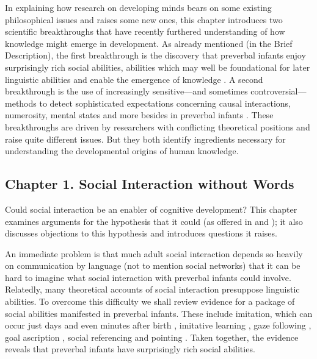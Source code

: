 \documentclass[12pt,\papersize]{extarticle}
\begin{document}
In explaining how research on developing minds bears on some existing philosophical issues and raises some new ones,
this chapter introduces two scientific breakthroughs that have recently furthered understanding of how knowledge might emerge in development.
As already mentioned (in the Brief Description), the first breakthrough is the discovery that preverbal infants enjoy surprisingly rich social abilities, abilities which
may well be foundational for later linguistic abilities and enable the emergence of knowledge \citep[e.g.][]{Csibra:2009xr,Meltzoff:2007pj,Tomasello:2005wx}. 
A second breakthrough is the use of increasingly sensitive---and sometimes controversial---methods to detect  sophisticated expectations concerning  causal interactions, numerosity, mental states and more besides in preverbal infants \citep[e.g.][]{Spelke:1990jn,Baillargeon:gx}.
These breakthroughs are driven by researchers with conflicting theoretical positions and raise quite different issues.  
But they both  identify ingredients necessary for understanding the developmental origins of human knowledge.



\subsection{Chapter 1. Social Interaction without Words}
Could social interaction be an enabler of cognitive development? 
This chapter examines arguments for the hypothesis that it could
 (as offered in \citealp{Tomasello:2003tq} and \citealp{Moll:2007gu}); it also discusses objections to this hypothesis and introduces questions it raises.
 
An immediate problem is that much adult social interaction depends so heavily on communication by language (not to mention social networks) that it can be hard to imagine what social interaction with preverbal infants could involve.
Relatedly, many theoretical accounts of social interaction presuppose linguistic abilities.
To overcome this difficulty we shall review evidence for a package of social abilities manifested in preverbal infants.
These include imitation, which can occur just days and even minutes after birth \citep{meltzoff:1977_imitation,field:1982_imitation,meltzoff:1983_newborn}, 
imitative learning \citep{carpenter:1998_fourteen}, 
gaze following \citep{Csibra:2008be},
goal ascription \citep{Gergely:1995sq,Woodward:2000jw},
social referencing \citep{Baldwin:2000qq} 
and 
pointing \citep{Liszkowski:2006ec}.  
Taken together, the evidence reveals that preverbal infants have surprisingly rich social abilities.
\end{document}
